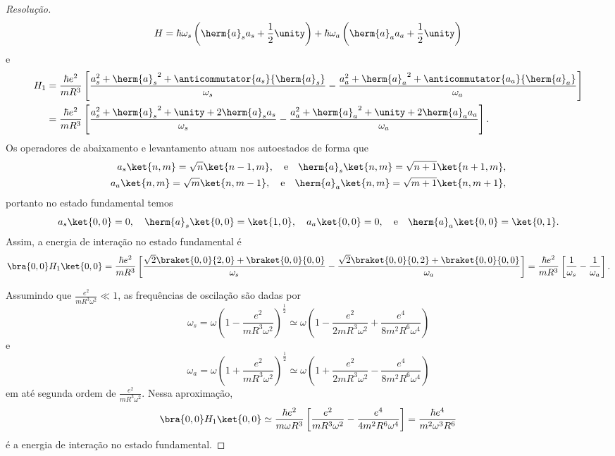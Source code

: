\begin{proof}[Resolução]
    \begin{equation*}
        H = \hbar \omega_s\left(\herm{a}_sa_s +  \frac12 \unity\right) + \hbar \omega_a \left(\herm{a}_aa_a + \frac12\unity\right)
    \end{equation*}
    e
    \begin{align*}
        H_1 &= \frac{\hbar e^2}{m R^3} \left[\frac{a_s^2 + {\herm{a}_s}^2  + \anticommutator{a_s}{\herm{a}_s}}{\omega_s} - \frac{a_a^2 + {\herm{a}_a}^2  + \anticommutator{a_a}{\herm{a}_a}}{\omega_a}\right]\\
            &= \frac{\hbar e^2}{m R^3} \left[\frac{a_s^2 + {\herm{a}_s}^2  + \unity + 2\herm{a}_sa_s}{\omega_s} - \frac{a_a^2 + {\herm{a}_a}^2  + \unity + 2\herm{a}_aa_a}{\omega_a}\right].
    \end{align*}
    Os operadores de abaixamento e levantamento atuam nos autoestados de forma que
    \begin{align*}
        a_s\ket{n,m} = \sqrt{n}\ket{n-1,m},\quad\text{e}\quad
        \herm{a}_s\ket{n,m} = \sqrt{n+1}\ket{n+1, m},\\
        a_a\ket{n,m} = \sqrt{m}\ket{n,m-1},\quad\text{e}\quad
        \herm{a}_a\ket{n,m} = \sqrt{m+1}\ket{n, m+1},
    \end{align*}
    portanto no estado fundamental temos
    \begin{equation*}
        a_s\ket{0,0} = 0,\quad
        \herm{a}_s\ket{0,0} = \ket{1, 0},\quad
        a_a\ket{0,0} = 0,\quad\text{e}\quad
        \herm{a}_a\ket{0,0} = \ket{0, 1}.
    \end{equation*}
    Assim, a energia de interação no estado fundamental é
    \begin{equation*}
        \bra{0,0}H_1\ket{0,0} = \frac{\hbar  e^2}{m R^3}\left[\frac{\sqrt{2}\braket{0,0}{2,0} + \braket{0,0}{0,0}}{\omega_s} - \frac{\sqrt{2}\braket{0,0}{0,2} + \braket{0,0}{0,0}}{\omega_a}\right] = \frac{\hbar e^2}{m R^3} \left[\frac{1}{\omega_s} - \frac{1}{\omega_a}\right].
    \end{equation*}

    Assumindo que \(\frac{e^2}{mR^3 \omega^2} \ll 1\), as frequências de oscilação são dadas por
    \begin{equation*}
        \omega_s = \omega \left(1 - \frac{e^2}{mR^3 \omega^2}\right)^{\frac12} \simeq \omega \left(1 - \frac{e^2}{2mR^3\omega^2} + \frac{e^4}{8m^2 R^6 \omega^4}\right)
    \end{equation*}
    e
    \begin{equation*}
        \omega_a = \omega \left(1 + \frac{e^2}{mR^3 \omega^2}\right)^{\frac12} \simeq \omega \left(1 + \frac{e^2}{2mR^3\omega^2} - \frac{e^4}{8m^2 R^6 \omega^4}\right)
    \end{equation*}
    em até segunda ordem de \(\frac{e^2}{mR^3 \omega^2}\). Nessa aproximação,
    \begin{equation*}
        \bra{0,0}H_1\ket{0,0} \simeq \frac{\hbar e^2}{m \omega R^3}\left[\frac{e^2}{mR^3 \omega^2} - \frac{e^4}{4m^2 R^6 \omega^4}\right] = \frac{\hbar e^4}{m^2 \omega^3 R^6}
    \end{equation*}
    é a energia de interação no estado fundamental.
\end{proof}

